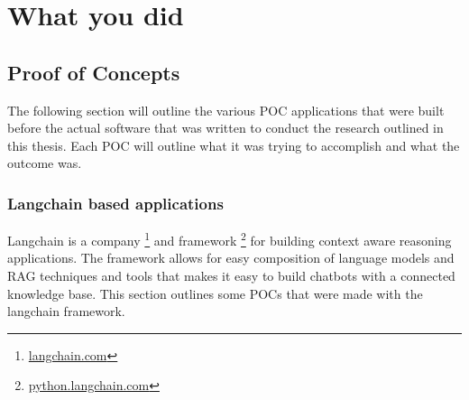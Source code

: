 ﻿\chapter{What you did}
\label{ch:whatYouDid}










\section{Proof of Concepts}


The following section will outline the various \gls{POC} applications that were built before the actual software that was written to conduct the research outlined in this thesis. Each \gls{POC} will outline what it was trying to accomplish and what the outcome was.


\subsection{Langchain based applications}


Langchain is a company \footnote{\href{https://langchain.com}{langchain.com}} and framework \footnote{\href{https://python.langchain.com}{python.langchain.com}} for building context aware reasoning applications. The framework allows for easy composition of language models and \gls{RAG} techniques and tools that makes it easy to build chatbots with a connected knowledge base. This section outlines some \gls{POC}s that were made with the langchain framework.


